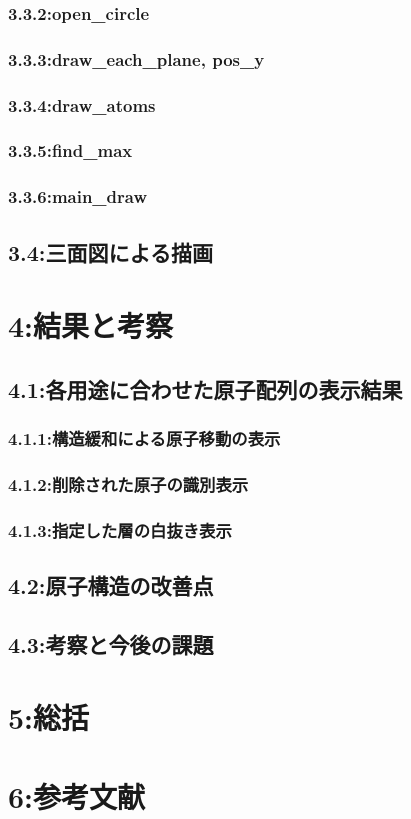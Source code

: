 \subsubsection{3.3.2:open\_circle}
\subsubsection{3.3.3:draw\_each\_plane, pos\_y}
\subsubsection{3.3.4:draw\_atoms}
\subsubsection{3.3.5:find\_max}
\subsubsection{3.3.6:main\_draw}
\subsection{3.4:三面図による描画}
\section{4:結果と考察}
\subsection{4.1:各用途に合わせた原子配列の表示結果}
\subsubsection{4.1.1:構造緩和による原子移動の表示}
\subsubsection{4.1.2:削除された原子の識別表示}
\subsubsection{4.1.3:指定した層の白抜き表示}
\subsection{4.2:原子構造の改善点}
\subsection{4.3:考察と今後の課題}
\section{5:総括}
\section{6:参考文献}
